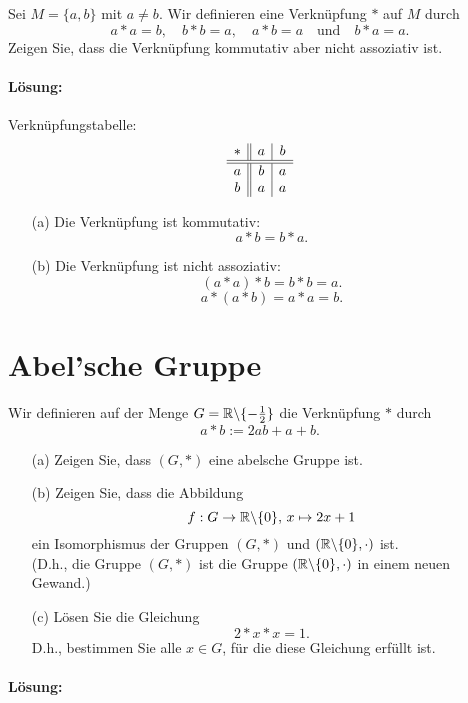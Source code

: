 \documentclass[
				a4paper,
				10pt
			]
			{scrartcl}
\begin{document}
Sei $M = \{a,b\}$ mit $a\neq b$. Wir definieren eine Verkn\"upfung $\ast$ auf $M$ durch
$$
	a\ast a = b, \quad b\ast b = a, \quad a \ast b =a \quad \text{und} \quad b\ast a = a.
$$ 
Zeigen Sie, dass die Verkn\"upfung kommutativ aber nicht assoziativ ist.

\paragraph{L\"osung:}

Verkn\"upfungstabelle:
$$
	\begin{array}{c || c | c}
		\ast	&	a	&	b\\
		\hline
		\hline
		a	&	b	& 	a\\
		b	&	a	&	a
	\end{array}
$$

\begin{itemize}
	\item[(a)] Die Verkn\"upfung ist kommutativ:
			$$
				a \ast b = b \ast a.
			$$
	\item[(b)] Die Verkn\"upfung ist nicht assoziativ:\\
			$$
				(a\ast a)\ast b = b\ast b = a.
			$$
			$$
				a\ast(a \ast b) = a\ast a = b.
			$$
\end{itemize}

\newpage
\section{Abel'sche Gruppe}
Wir definieren auf der Menge $G= \mathbb{R}\backslash\{-\frac{1}{2}\}$ die Verkn\"upfung $\ast$ durch
$$
	a\ast b := 2ab +a +b.
$$
\begin{itemize}
	\item[(a)] Zeigen Sie, dass $(G,\ast)$ eine abelsche Gruppe ist.
	\item[(b)] Zeigen Sie, dass die Abbildung
			$$
				f: G \to \mathbb{R}\backslash\{0\},\, x\mapsto 2x + 1
			$$
			ein Isomorphismus der Gruppen $(G,\ast)$ und $(\mathbb{R}\backslash\{0\}, \cdot)$ ist.\\
			(D.h., die Gruppe $(G,\ast)$ ist die Gruppe $(\mathbb{R}\backslash\{0\}, \cdot)$ in einem neuen Gewand.)
	\item[(c)] L\"osen Sie die Gleichung
			$$
				2\ast x\ast x = 1.
			$$
			D.h., bestimmen Sie alle $x\in G$, f\"ur die diese Gleichung erf\"ullt ist.
\end{itemize}

\paragraph{L\"osung:}
\end{document}
